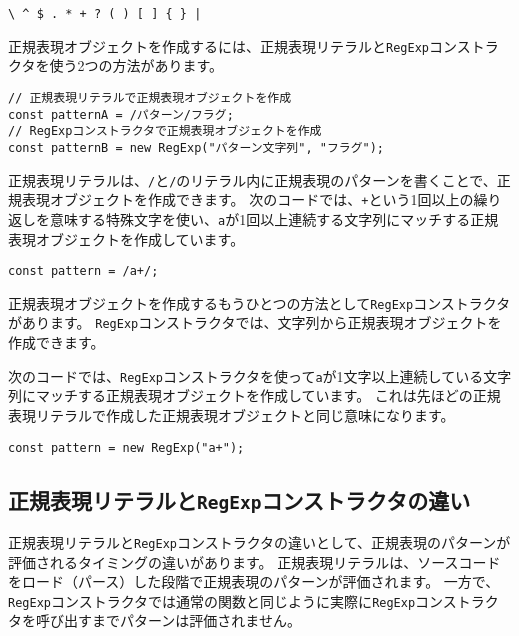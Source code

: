 \begin{lstlisting}
\ ^ $ . * + ? ( ) [ ] { } |
\end{lstlisting}

正規表現オブジェクトを作成するには、正規表現リテラルと\texttt{RegExp}コンストラクタを使う2つの方法があります。

\begin{lstlisting}
// 正規表現リテラルで正規表現オブジェクトを作成
const patternA = /パターン/フラグ;
// RegExpコンストラクタで正規表現オブジェクトを作成
const patternB = new RegExp("パターン文字列", "フラグ");
\end{lstlisting}

正規表現リテラルは、\texttt{/}と\texttt{/}のリテラル内に正規表現のパターンを書くことで、正規表現オブジェクトを作成できます。
次のコードでは、\texttt{+}という1回以上の繰り返しを意味する特殊文字を使い、\texttt{a}が1回以上連続する文字列にマッチする正規表現オブジェクトを作成しています。

\begin{lstlisting}
const pattern = /a+/;
\end{lstlisting}

正規表現オブジェクトを作成するもうひとつの方法として\texttt{RegExp}コンストラクタがあります。
\texttt{RegExp}コンストラクタでは、文字列から正規表現オブジェクトを作成できます。

次のコードでは、\texttt{RegExp}コンストラクタを使って\texttt{a}が1文字以上連続している文字列にマッチする正規表現オブジェクトを作成しています。
これは先ほどの正規表現リテラルで作成した正規表現オブジェクトと同じ意味になります。

\begin{lstlisting}
const pattern = new RegExp("a+");
\end{lstlisting}

\hypertarget{difference-regexp-literal-regexp-constructor}{%
\subsection{\texorpdfstring{正規表現リテラルと\texttt{RegExp}コンストラクタの違い}{正規表現リテラルとRegExpコンストラクタの違い}}\label{difference-regexp-literal-regexp-constructor}}

正規表現リテラルと\texttt{RegExp}コンストラクタの違いとして、正規表現のパターンが評価されるタイミングの違いがあります。
正規表現リテラルは、ソースコードをロード（パース）した段階で正規表現のパターンが評価されます。
一方で、\texttt{RegExp}コンストラクタでは通常の関数と同じように実際に\texttt{RegExp}コンストラクタを呼び出すまでパターンは評価されません。

